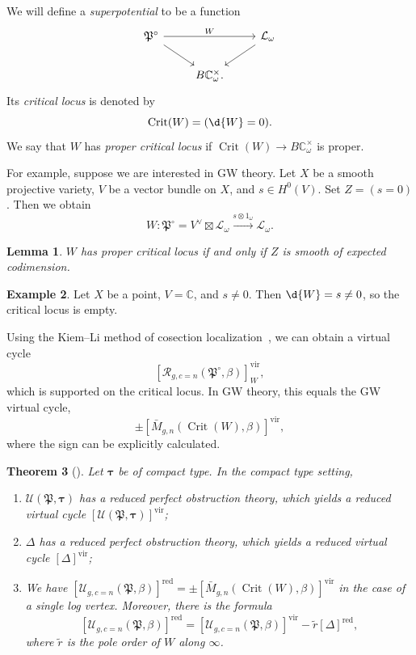 \documentclass{amsart}
\newtheorem{thm}{Theorem}[section]
\newtheorem{lem}[thm]{Lemma}
\theoremstyle{definition}
\newtheorem{exm}[thm]{Example}
\theoremstyle{remark}
\theoremstyle{plain}
\theoremstyle{definition}
\theoremstyle{remark}
\newcommand{\C}{\mathbb{C}}
\newcommand{\mc}[1]{\mathcal{#1}}
\newcommand{\mf}[1]{\mathfrak{#1}}
\newcommand{\mr}[1]{\mathrm{#1}}
\newcommand{\on}[1]{\operatorname{#1}}
\newcommand{\1}{\mathbf{1}}
\newcommand{\2}{\mathbf{2}}
\newcommand{\3}{\mathbf{3}}
\newcommand{\vir}{\mr{vir}}
\begin{document}
We will define a \textit{superpotential} to be a function
\begin{equation*}
\begin{tikzcd}
    \mf{P}^{\circ} \ar{rr}{W} \ar{dr} && \mc{L}_{\omega} \ar{dl} \\
    & B \C_{\omega}^{\times}.
\end{tikzcd}
\end{equation*}
Its \textit{critical locus} is denoted by 
\[ \on{Crit}(W) = (\d{W} = 0). \]
We say that \(W\) has \textit{proper critical locus} if \(\on{Crit}(W) \to B\C_{\omega}^{\times}\) is proper.

For example, suppose we are interested in GW theory. Let \(X\) be a smooth projective variety, \(V\) be a vector bundle on \(X\), and \(s \in H^0(V)\). Set \(Z = (s = 0)\). Then we obtain
\[ W \colon \mf{P}^{\circ} = V^{\vee} \boxtimes \mc{L}_{\omega} \xrightarrow{s \otimes 1_{\omega}} \mc{L}_{\omega}. \]

\begin{lem}
    \(W\) has proper critical locus if and only if \(Z\) is smooth of expected codimension.
\end{lem}

\begin{exm}
    Let \(X\) be a point, \(V = \C\), and \(s \neq 0\). Then \(\d{W} = s \neq 0\), so the critical locus is empty.
\end{exm}

Using the Kiem--Li method of cosection localization~\cite{KiemLi2013}, we can obtain a virtual cycle
\[ [\mc{R}_{g, c=n}(\mf{P}^{\circ}, \beta)]_W^{\vir}, \]
which is supported on the critical locus. In GW theory, this equals the GW virtual cycle, 
\[ \pm [\bar{M}_{g,n}(\on{Crit}(W), \beta)]^{\vir}, \]
where the sign can be explicitly calculated.

\begin{thm}[{\cite{CJR2021,CJW2021}}]
    Let \(\bm{\tau}\) be of compact type. In the compact type setting, 
    \begin{enumerate}
        \item \(\mc{U}(\mf{P}, \bm{\tau})\) has a reduced perfect obstruction theory, which yields a reduced virtual cycle \([\mc{U}(\mf{P}, \bm{\tau})]^{\vir}\);
        \item \(\Delta\) has a reduced perfect obstruction theory, which yields a reduced virtual cycle \([\Delta]^{\vir}\);
        \item We have \([\mc{U}_{g, c=n}(\mf{P}, \beta)]^{\on{red}} = \pm [\bar{M}_{g,n}(\on{Crit}(W), \beta)]^{\vir}\) in the case of a single log vertex. Moreover, there is the formula
            \[ [\mc{U}_{g, c=n}(\mf{P}, \beta)]^{\on{red}} = [\mc{U}_{g, c=n}(\mf{P}, \beta)]^{\vir} - \tilde{r} [\Delta]^{\on{red}}, \]
            where \(\tilde{r}\) is the pole order of \(W\) along \(\infty\).
    \end{enumerate}
\end{thm}
\end{document}
